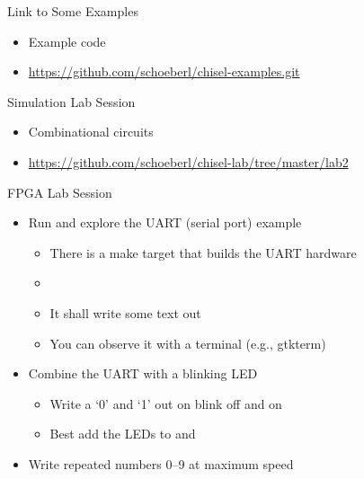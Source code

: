 \begin{frame}[fragile]{Link to Some Examples}
\begin{itemize}
\item Example code
\item \url{https://github.com/schoeberl/chisel-examples.git}
\end{itemize}
\end{frame}

\begin{frame}[fragile]{Simulation Lab Session}
\begin{itemize}
\item Combinational circuits
\item \url{https://github.com/schoeberl/chisel-lab/tree/master/lab2}
\end{itemize}
\end{frame}

\begin{frame}[fragile]{FPGA Lab Session}
\begin{itemize}
\item Run and explore the UART (serial port) example
\begin{itemize}
\item There is a make target that builds the UART hardware
\item {}
\item It shall write some text out
\item You can observe it with a terminal (e.g., gtkterm)
\end{itemize}
\item Combine the UART with a blinking LED
\begin{itemize}
\item Write a `0' and `1' out on blink off and on
\item Best add the LEDs to  and 
\end{itemize}
\item Write repeated numbers 0--9 at maximum speed 
\end{itemize}
\end{frame}




